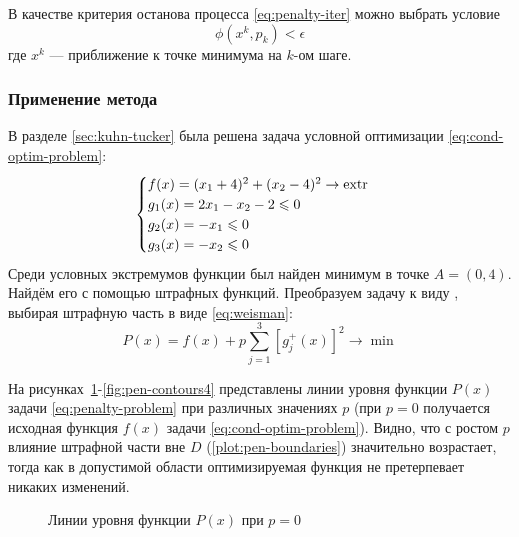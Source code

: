 В качестве критерия останова процесса \eqref{eq:penalty-iter} можно
выбрать условие
\begin{equation*}
  \phi(x^k, p_k) < \epsilon
\end{equation*}
где $x^k$ — приближение к точке минимума на $k$-ом шаге.

\subsubsection{Применение метода}
\label{sec:penalty-usage}

В разделе \ref{sec:kuhn-tucker} была решена задача условной
оптимизации \eqref{eq:cond-optim-problem}:
\begin{equation*}
  \begin{cases}
    f(x) = (x_1+4)^2 + (x_2-4)^2 \to \operatorname{extr} \\
    g_1(x) = 2x_1 - x_2 - 2 \leqslant 0 \\
    g_2(x) = -x_1 \leqslant 0 \\
    g_3(x) = -x_2 \leqslant 0
  \end{cases}
\end{equation*}
Среди условных экстремумов функции был найден минимум в точке $A = (0,
4)$. Найдём его с помощью штрафных функций. Преобразуем задачу к виду
\label{eq:penalty-iter}, выбирая штрафную часть в виде
\eqref{eq:weisman}:
\begin{equation}
  \label{eq:penalty-problem}
  P(x) = f(x) + p \sum_{j=1}^3{ \left [ g_j^+(x) \right ]^2} \to \min
\end{equation}

На рисунках \ref{fig:pen-contours1}-\ref{fig:pen-contours4}
представлены линии уровня функции $P(x)$ задачи
\eqref{eq:penalty-problem} при различных значениях $p$ (при $p=0$
получается исходная функция $f(x)$ задачи
\eqref{eq:cond-optim-problem}). Видно, что с ростом $p$ влияние
штрафной части вне $D$ (\ref{plot:pen-boundaries}) значительно
возрастает, тогда как в допустимой области оптимизируемая функция не
претерпевает никаких изменений.

\begin{figure}[!thb]
  \centering
  \caption{Линии уровня функции $P(x)$ при $p=0$}
  \label{fig:pen-contours1}
\end{figure}

